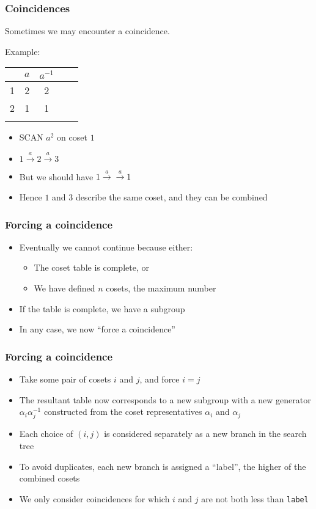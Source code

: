 \documentclass{beamer}
\begin{document}
\begin{frame}
  \frametitle{Coincidences}
  Sometimes we may encounter a coincidence.

  Example:
  \begin{table}
    \begin{tabular}{r | c c c c}
      & $a$ & $a^{-1}$ \\ \hline
      1 & 2 & 2\\
      2 & \phantom{3} 1 \phantom{1} & 1 \\ \\
    \end{tabular}
  \end{table}
  
  \begin{itemize}
  \item SCAN $a^2$ on coset $1$ 
  \item $ 1 \overset{a}{\rightarrow} 2 \overset{a}{\rightarrow} 3$ 
  \item But we should have $ 1 \overset{a}{\rightarrow} \overset{a}{\rightarrow} 1$ 
  \item Hence $1$ and $3$ describe the same coset, and they can be combined
  \end{itemize}
\end{frame}

\begin{frame}
  \frametitle{Forcing a coincidence}
  \begin{itemize}
  \item Eventually we cannot continue because either: \pause
    \begin{itemize}
    \item The coset table is complete\pause, or
    \item We have defined $n$ cosets, the maximum number \pause
    \end{itemize}
  \item If the table is complete, we have a subgroup \pause
  \item In any case, we now ``force a coincidence''
  \end{itemize}
\end{frame}

\begin{frame}
  \frametitle{Forcing a coincidence}
  \begin{itemize}
  \item Take some pair of cosets $i$ and $j$, and force $i=j$ \pause
  \item The resultant table now corresponds to a new subgroup with a new generator $\alpha_i \alpha_j^{-1}$ constructed from the coset representatives $\alpha_i$ and $\alpha_j$ \pause
  \item Each choice of $(i,j)$ is considered separately as a new branch in the search tree \pause
  \item To avoid duplicates, each new branch is assigned a ``label'', the higher of the combined cosets \pause
  \item We only consider coincidences for which $i$ and $j$ are not both less than \texttt{label}
  \end{itemize}
\end{frame}
\end{document}
